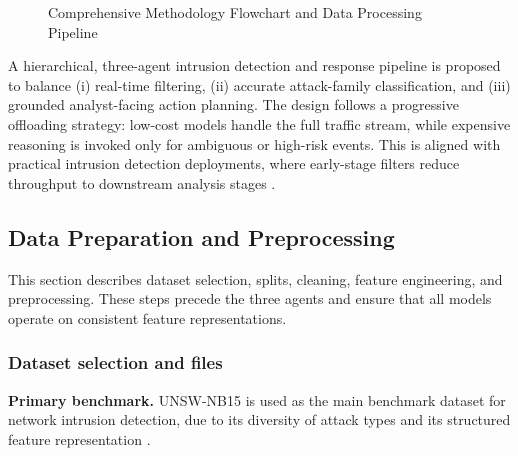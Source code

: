 \documentclass[conference]{IEEEtran}
\begin{document}
\begin{figure}[t]
\caption{Comprehensive Methodology Flowchart and Data Processing Pipeline}
\label{fig:methodology_diagram}
\end{figure}

A hierarchical, three-agent intrusion detection and response pipeline is proposed to balance (i) real-time filtering, (ii) accurate attack-family classification, and (iii) grounded analyst-facing action planning. The design follows a progressive offloading strategy: low-cost models handle the full traffic stream, while expensive reasoning is invoked only for ambiguous or high-risk events. This is aligned with practical intrusion detection deployments, where early-stage filters reduce throughput to downstream analysis stages \cite{Mirsky2018Kitsune}.

\subsection{Data Preparation and Preprocessing}
\label{sec:data_preparation}

This section describes dataset selection, splits, cleaning, feature engineering, and preprocessing. These steps precede the three agents and ensure that all models operate on consistent feature representations.

\subsubsection{Dataset selection and files}
\textbf{Primary benchmark.} UNSW-NB15 is used as the main benchmark dataset for network intrusion detection, due to its diversity of attack types and its structured feature representation \cite{Moustafa2015UNSW,Moustafa2015UNSW2}.
\end{document}
